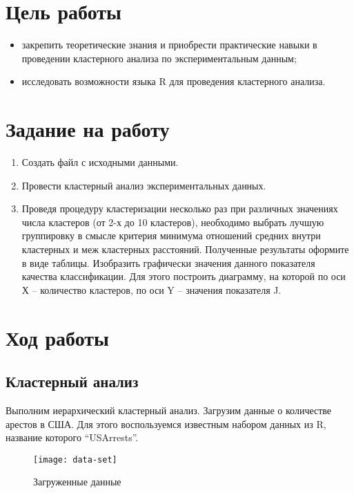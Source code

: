 \documentclass[a4paper,14pt]{extarticle}
\begin{document}


\section{Цель работы}
\begin{itemize}
    \item закрепить теоретические знания и приобрести практические навыки в
          проведении кластерного анализа по экспериментальным данным;
    \item исследовать возможности языка R для проведения кластерного анализа.
\end{itemize}

\section{Задание на работу}
\begin{enumerate}
    \item Создать файл с исходными данными.
    \item Провести кластерный анализ экспериментальных данных.
    \item Проведя процедуру кластеризации несколько раз при различных значениях
          числа кластеров (от 2-х до 10 кластеров), необходимо выбрать лучшую
          группировку в смысле критерия минимума отношений средних внутри
          кластерных и меж кластерных расстояний. Полученные результаты оформите
          в виде таблицы. Изобразить графически значения данного показателя
          качества классификации. Для этого построить диаграмму, на которой по
          оси Х – количество кластеров, по оси Y – значения показателя J.
\end{enumerate}

\section{Ход работы}
\subsection{Кластерный анализ}
Выполним иерархический кластерный анализ. Загрузим данные о количестве арестов в
США. Для этого воспользуемся известным набором данных из R, название которого
\enquote{USArrests}.

\begin{figure}[H]
    \centering
    \texttt{[image: data-set]}
    \caption{Загруженные данные}
    \label{fig:data-set}
\end{figure}
\end{document}
